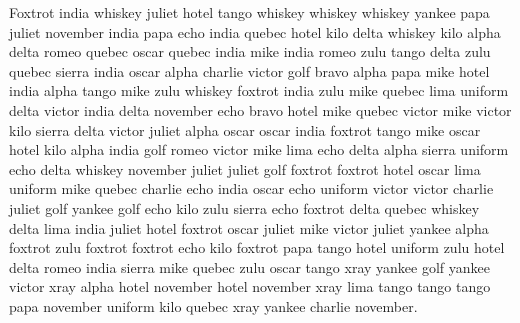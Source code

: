 \documentclass[12pt]{article}
\begin{document}
Foxtrot india whiskey juliet hotel tango whiskey whiskey whiskey yankee
papa juliet november india papa echo india quebec hotel kilo delta
whiskey kilo alpha delta romeo quebec oscar quebec india mike india
romeo zulu tango delta zulu quebec sierra india oscar alpha charlie
victor golf bravo alpha papa mike hotel india alpha tango mike zulu
whiskey foxtrot india zulu mike quebec lima uniform delta victor india
delta november echo bravo hotel mike quebec victor mike victor kilo
sierra delta victor juliet alpha oscar oscar india foxtrot tango mike
oscar hotel kilo alpha india golf romeo victor mike lima echo delta
alpha sierra uniform echo delta whiskey november juliet juliet golf
foxtrot foxtrot hotel oscar lima uniform mike quebec charlie echo india
oscar echo uniform victor victor charlie juliet golf yankee golf echo
kilo zulu sierra echo foxtrot delta quebec whiskey delta lima india
juliet hotel foxtrot oscar juliet mike victor juliet yankee alpha
foxtrot zulu foxtrot foxtrot echo kilo foxtrot papa tango hotel uniform
zulu hotel delta romeo india sierra mike quebec zulu oscar tango xray
yankee golf yankee victor xray alpha hotel november hotel november xray
lima tango tango tango papa november uniform kilo quebec xray yankee
charlie november.
\end{document}
